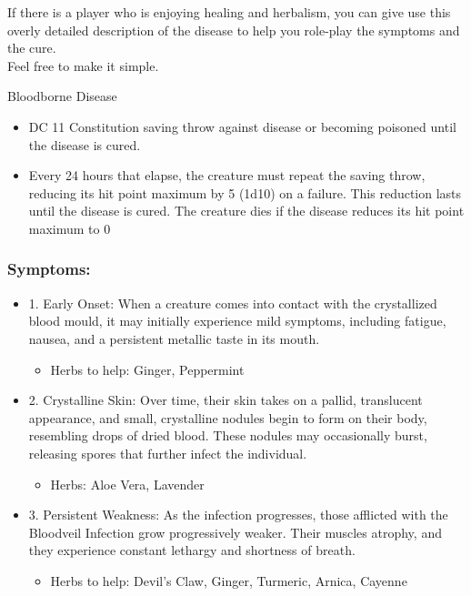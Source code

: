 \documentclass[10pt,onecolumn,twoside,openany,bg=full,layout=true]{dndbook}
\begin{document}
If there is a player who is enjoying healing and herbalism, you can give use this overly detailed description of the disease to help you role-play the symptoms and the cure.\\
Feel free to make it simple.
\begin{DndComment}{Bloodborne Disease}
\begin{itemize}
\item DC 11 Constitution saving throw against disease or becoming poisoned until the disease is cured.
\item Every 24 hours that elapse, the creature must repeat the saving throw, reducing its hit point maximum by 5 (1d10) on a failure.
This reduction lasts until the disease is cured.
The creature dies if the disease reduces its hit point maximum to 0
\end{itemize}

\subsubsection*{Symptoms:}
\begin{itemize}
  \item 1. Early Onset: When a creature comes into contact with the crystallized blood mould, it may initially experience mild symptoms, including fatigue, nausea, and a persistent metallic taste in its mouth.
    \begin{itemize}
      \item Herbs to help: Ginger, Peppermint
    \end{itemize}

  \item 2. Crystalline Skin: Over time, their skin takes on a pallid, translucent appearance, and small, crystalline nodules begin to form on their body, resembling drops of dried blood. These nodules may occasionally burst, releasing spores that further infect the individual.
    \begin{itemize}
      \item Herbs: Aloe Vera, Lavender
    \end{itemize}

  \item 3. Persistent Weakness: As the infection progresses, those afflicted with the Bloodveil Infection grow progressively weaker.
  Their muscles atrophy, and they experience constant lethargy and shortness of breath.
    \begin{itemize}
      \item Herbs to help: Devil's Claw, Ginger, Turmeric, Arnica, Cayenne
    \end{itemize}


\end{itemize}
\end{DndComment}
\end{document}
